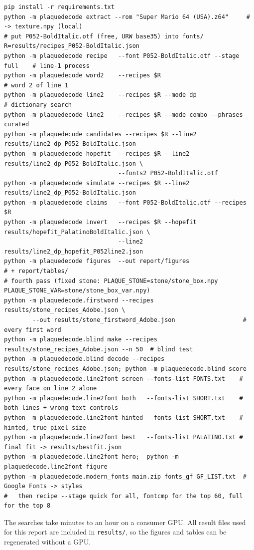 \documentclass[10pt,a4paper]{article}
\begin{document}
{\footnotesize
\begin{verbatim}
pip install -r requirements.txt
python -m plaquedecode extract --rom "Super Mario 64 (USA).z64"     # -> texture.npy (local)
# put P052-BoldItalic.otf (free, URW base35) into fonts/
R=results/recipes_P052-BoldItalic.json
python -m plaquedecode recipe   --font P052-BoldItalic.otf --stage full    # line-1 process
python -m plaquedecode word2    --recipes $R                               # word 2 of line 1
python -m plaquedecode line2    --recipes $R --mode dp                     # dictionary search
python -m plaquedecode line2    --recipes $R --mode combo --phrases curated
python -m plaquedecode candidates --recipes $R --line2 results/line2_dp_P052-BoldItalic.json
python -m plaquedecode hopefit  --recipes $R --line2 results/line2_dp_P052-BoldItalic.json \
                                --fonts2 P052-BoldItalic.otf
python -m plaquedecode simulate --recipes $R --line2 results/line2_dp_P052-BoldItalic.json
python -m plaquedecode claims   --font P052-BoldItalic.otf --recipes $R
python -m plaquedecode invert   --recipes $R --hopefit results/hopefit_PalatinoBoldItalic.json \
                                --line2 results/line2_dp_hopefit_P052line2.json
python -m plaquedecode figures  --out report/figures                      # + report/tables/
# fourth pass (fixed stone: PLAQUE_STONE=stone/stone_box.npy PLAQUE_STONE_VAR=stone/stone_box_var.npy)
python -m plaquedecode.firstword --recipes results/stone_recipes_Adobe.json \
        --out results/stone_firstword_Adobe.json                   # every first word
python -m plaquedecode.blind make --recipes results/stone_recipes_Adobe.json --n 50  # blind test
python -m plaquedecode.blind decode --recipes results/stone_recipes_Adobe.json; python -m plaquedecode.blind score
python -m plaquedecode.line2font screen --fonts-list FONTS.txt    # every face on line 2 alone
python -m plaquedecode.line2font both   --fonts-list SHORT.txt    # both lines + wrong-text controls
python -m plaquedecode.line2font hinted --fonts-list SHORT.txt    # hinted, true pixel size
python -m plaquedecode.line2font best   --fonts-list PALATINO.txt # final fit -> results/bestfit.json
python -m plaquedecode.line2font hero;  python -m plaquedecode.line2font figure
python -m plaquedecode.modern_fonts main.zip fonts_gf GF_LIST.txt  # Google Fonts -> styles
#   then recipe --stage quick for all, fontcmp for the top 60, full for the top 8
\end{verbatim}}
The searches take minutes to an hour on a consumer GPU. All result files used for this report are included in
\texttt{results/}, so the figures and tables can be regenerated without a GPU.
\end{document}
